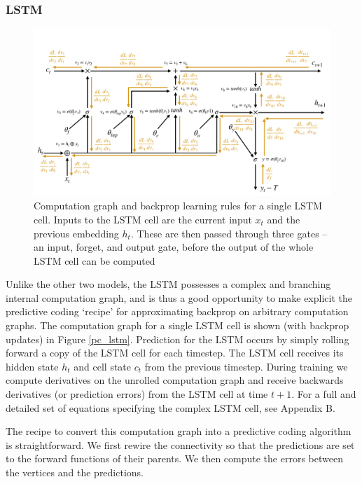 \subsubsection{LSTM}
\begin{figure}[ht]
  \centering
  \includegraphics[width=1\linewidth]{chapter_6_figures/backprop_LSTM.pdf}  
\caption{Computation graph and backprop learning rules for a single LSTM cell. Inputs to the LSTM cell are the current input $x_t$ and the previous embedding $h_t$. These are then passed through three gates -- an input, forget, and output gate, before the output of the whole LSTM cell can be computed}

\label{PC_LSTM}
\end{figure}
Unlike the other two models, the LSTM possesses a complex and branching internal computation graph, and is thus a good opportunity to make explicit the predictive coding `recipe' for approximating backprop on arbitrary computation graphs. The computation graph for a single LSTM cell is shown (with backprop updates) in Figure \ref{pc_lstm}. Prediction for the LSTM occurs by simply rolling forward a copy of the LSTM cell for each timestep. The LSTM cell receives its hidden state $h_t$ and cell state $c_t$ from the previous timestep. During training we compute derivatives on the unrolled computation graph and receive backwards derivatives (or prediction errors) from the LSTM cell at time $t+1$. For a full and detailed set of equations specifying the complex LSTM cell, see Appendix B.

The recipe to convert this computation graph into a predictive coding algorithm is straightforward. We first rewire the connectivity so that the predictions are set to the forward functions of their parents. We then compute the errors between the vertices and the predictions. 


